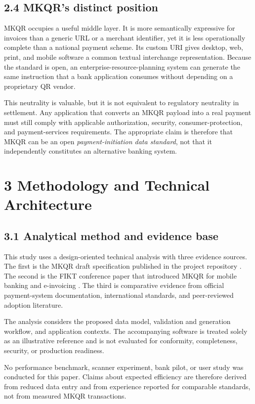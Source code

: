 \subsection{2.4 MKQR's distinct position}

MKQR occupies a useful middle layer. It is more semantically expressive for invoices than a generic URL or a merchant identifier, yet it is less operationally complete than a national payment scheme. Its custom URI gives desktop, web, print, and mobile software a common textual interchange representation. Because the standard is open, an enterprise-resource-planning system can generate the same instruction that a bank application consumes without depending on a proprietary QR vendor.

This neutrality is valuable, but it is not equivalent to regulatory neutrality in settlement. Any application that converts an MKQR payload into a real payment must still comply with applicable authorization, security, consumer-protection, and payment-services requirements. The appropriate claim is therefore that MKQR can be an open \textit{payment-initiation data standard}, not that it independently constitutes an alternative banking system.

\section{3 Methodology and Technical Architecture}

\subsection{3.1 Analytical method and evidence base}

This study uses a design-oriented technical analysis with three evidence sources. The first is the MKQR draft specification published in the project repository \cite{mkqrrepo}. The second is the FIKT conference paper that introduced MKQR for mobile banking and e-invoicing \cite{jolevski2024}. The third is comparative evidence from official payment-system documentation, international standards, and peer-reviewed adoption literature.

The analysis considers the proposed data model, validation and generation workflow, and application contexts. The accompanying software is treated solely as an illustrative reference and is not evaluated for conformity, completeness, security, or production readiness.

No performance benchmark, scanner experiment, bank pilot, or user study was conducted for this paper. Claims about expected efficiency are therefore derived from reduced data entry and from experience reported for comparable standards, not from measured MKQR transactions.

